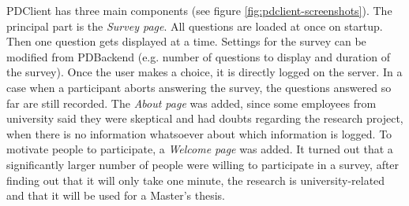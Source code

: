 		PDClient has three main components (see figure \ref{fig:pdclient-screenshots}). The principal part is the \textit{Survey page}. All questions are loaded at once on startup. Then one question gets displayed at a time. Settings for the survey can be modified from PDBackend (e.g. number of questions to display and duration of the survey). Once the user makes a choice, it is directly logged on the server. In a case when a participant aborts answering the survey, the questions answered so far are still recorded. The \textit{About page} was added, since some employees from university said they were skeptical and had doubts regarding the research project, when there is no information whatsoever about which information is logged. To motivate people to participate, a \textit{Welcome page} was added. It turned out that a significantly larger number of people were willing to participate in a survey, after finding out that it will only take one minute, the research is university-related and that it will be used for a Master's thesis.


